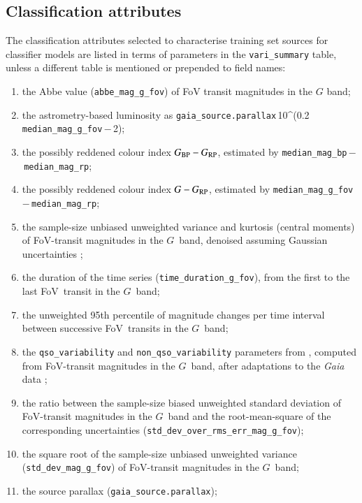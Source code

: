 \documentclass[longauth]{aa}
\def\gaia{\textit{Gaia}\xspace}
\def\g{$G$\xspace}
\def\bprp{\mbox{$G_{\rm BP}-G_{\rm RP}$}\xspace}
\def\grp{\mbox{$G-G_{\rm RP}$}\xspace}
\begin{document}
\begin{appendix}
\section{Classification attributes\label{app:attributes}}
The classification attributes selected to characterise training set sources for classifier models are listed in terms of parameters in the \texttt{vari\_summary} table, unless a different table is mentioned or prepended to field names:
\begin{enumerate}
\item the Abbe value ({\texttt{abbe\_mag\_g\_fov}}) of FoV transit magnitudes in the \g band; 
\item the astrometry-based luminosity \citep{1999ASPC..167...13A} as {\texttt{gaia\_source.parallax}}\,10\string^(0.2\,{\texttt{median\_mag\_g\_fov}}\,$-$\,2); 
\item the possibly reddened colour index \bprp, estimated by  {\texttt{median\_mag\_bp}}\,$-$\,{\texttt{median\_mag\_rp}}; 
\item the possibly reddened colour index \grp, estimated by {\texttt{median\_mag\_g\_fov}}\,$-$\,{\texttt{median\_mag\_rp}}; 
\item the sample-size unbiased unweighted variance and kurtosis (central moments) of FoV-transit magnitudes in the \g~band, denoised assuming Gaussian uncertainties \citep{2014A&C.....5....1R}; 
\item the duration of the time series ({\texttt{time\_duration\_g\_fov}}), from the first to the last FoV~transit in the \g~band; 
\item the unweighted 95th percentile of magnitude changes per time interval between successive FoV~transits in the \g~band; 
\item the {\texttt{qso\_variability}} and {\texttt{non\_qso\_variability}} parameters from \citet{2011AJ....141...93B}, computed from FoV-transit magnitudes in the \g~band, after adaptations to the \gaia data \citep[these values are published only in the \texttt{vari\_agn} table, see][]{DR3-DPACP-167};
\item the ratio between the sample-size biased unweighted standard deviation of FoV-transit magnitudes in the \g~band and the root-mean-square of the corresponding uncertainties ({\texttt{std\_dev\_over\_rms\_err\_mag\_g\_fov}});
\item the square root of the sample-size unbiased unweighted variance ({\texttt{std\_dev\_mag\_g\_fov}}) of FoV-transit magnitudes in the \g~band; 
\item the source parallax ({\texttt{gaia\_source.parallax}}); 

\end{enumerate}
\end{appendix}
\end{document}
